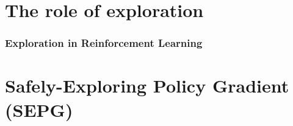 \documentclass{beamer}
\begin{document}
\section{The role of exploration}

\begin{frame}
\frametitle{Exploration in Reinforcement Learning}
\centering
\end{frame}


%
%









\section{Safely-Exploring Policy Gradient (SEPG)}
\end{document}
